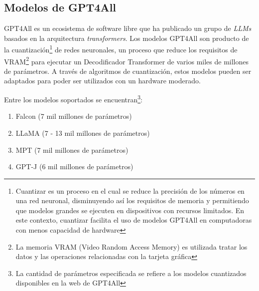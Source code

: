     \subsection{Modelos de GPT4All}

        GPT4All es un ecosistema de software libre que ha publicado un grupo de \emph{LLMs} basados en la arquitectura \emph{transformers}\cite{attention}. Los modelos GPT4All son producto de la cuantización\footnote{Cuantizar es un proceso en el cual se reduce la precisión de los números en una red neuronal, disminuyendo así los requisitos de memoria y permitiendo que modelos grandes se ejecuten en dispositivos con recursos limitados. En este contexto, cuantizar facilita el uso de modelos GPT4All en computadoras con menos capacidad de hardware} de redes neuronales, un proceso que reduce los requisitos de VRAM\footnote{La memoria VRAM (Video Random Access Memory) es utilizada tratar los datos y las operaciones relacionadas con la tarjeta gráfica} para ejecutar un Decodificador Transformer de varios miles de millones de parámetros. A través de algoritmos de cuantización, estos modelos pueden ser adaptados para poder ser utilizados con un hardware moderado\cite{webgpt4all}.
        
        Entre los modelos soportados se encuentran\footnote{La cantidad de parámetros especificada se refiere a los modelos cuantizados disponibles en la web de GPT4All}:

        \begin{enumerate}
            \item Falcon (7 mil millones de parámetros)~\cite{falcon}
            \item LLaMA (7 - 13 mil millones de parámetros)~\cite{llama}
            \item MPT (7 mil millones de parámetros)~\cite{mpt}
            \item GPT-J (6 mil millones de parámetros)~\cite{gptj}
        \end{enumerate}


